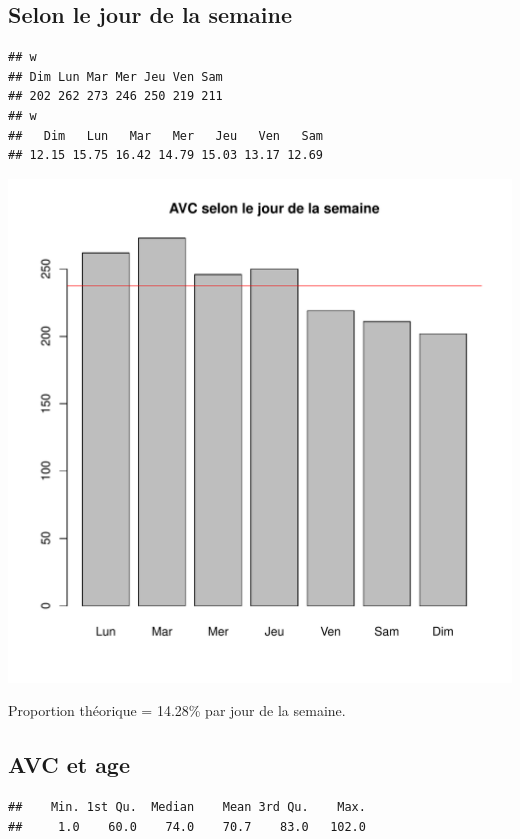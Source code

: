 \documentclass[12pt,english,french,twoside]{report}\usepackage[]{graphicx}\usepackage[]{color}
\makeatletter
\def\maxwidth{ %
  \ifdim\Gin@nat@width>\linewidth
    \linewidth
  \else
    \Gin@nat@width
  \fi
}
\newenvironment{kframe}{%
 \def\at@end@of@kframe{}%
 \ifinner\ifhmode%
  \def\at@end@of@kframe{\end{minipage}}%
  \begin{minipage}{\columnwidth}%
 \fi\fi%
 \def\FrameCommand##1{\hskip\@totalleftmargin \hskip-\fboxsep
 \colorbox{shadecolor}{##1}\hskip-\fboxsep
     \hskip-\linewidth \hskip-\@totalleftmargin \hskip\columnwidth}%
 \MakeFramed {\advance\hsize-\width
   \@totalleftmargin\z@ \linewidth\hsize
   \@setminipage}}%
 {\par\unskip\endMakeFramed%
 \at@end@of@kframe}
\newenvironment{knitrout}{}{} %
\makeatother
\begin{document}
\subsection*{Selon le jour de la semaine}

\begin{knitrout}
\color{fgcolor}\begin{kframe}
\begin{verbatim}
## w
## Dim Lun Mar Mer Jeu Ven Sam 
## 202 262 273 246 250 219 211
## w
##   Dim   Lun   Mar   Mer   Jeu   Ven   Sam 
## 12.15 15.75 16.42 14.79 15.03 13.17 12.69
\end{verbatim}
\end{kframe}
\includegraphics[width=\maxwidth]{figure/avc_jour_semaine} 

\end{knitrout}

Proportion théorique = 14.28\% par jour de la semaine.

\subsection*{AVC et age}
\begin{knitrout}
\color{fgcolor}\begin{kframe}
\begin{verbatim}
##    Min. 1st Qu.  Median    Mean 3rd Qu.    Max. 
##     1.0    60.0    74.0    70.7    83.0   102.0
\end{verbatim}
\end{kframe}
\end{knitrout}
\end{document}
